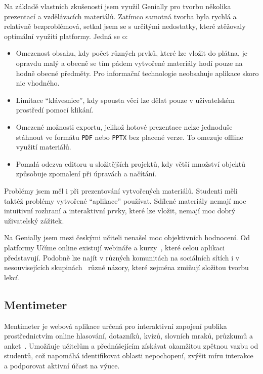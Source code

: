 Na základě vlastních zkušeností jsem využil Genially pro tvorbu několika prezentací a vzdělávacích materiálů. 
Zatímco samotná tvorba byla rychlá a relativně bezproblémová, setkal jsem se s určitými nedostatky, které ztěžovaly optimální využití platformy. 
Jedná se o:

\begin{itemize}
    \item Omezenost obsahu, kdy počet různých prvků, které lze vložit do plátna, je opravdu malý a obecně se tím pádem vytvořené materiály hodí pouze na hodně obecné předměty. Pro informační technologie neobsahuje aplikace skoro nic vhodného.  
    \item Limitace \enquote{klávesnice}, kdy spousta věcí lze dělat pouze v uživatelském prostředí pomocí klikání. 
    \item Omezené možnosti exportu, jelikož hotové prezentace nelze jednoduše stáhnout ve formátu \texttt{PDF} nebo \texttt{PPTX} bez placené verze. To omezuje offline využití materiálů.  
    \item Pomalá odezva editoru u složitějších projektů, kdy větší množství objektů způsobuje zpomalení při úpravách a načítání.  
\end{itemize}

Problémy jsem měl i při prezentování vytvořených materiálů. 
Studenti měli taktéž problémy vytvořené \enquote{aplikace} používat. 
Sdílené materiály nemají moc intuitivní rozhraní a interaktivní prvky, které lze vložit, nemají moc dobrý uživatelský zážitek.

Na Genially jsem mezi českými učiteli nenašel moc objektivních hodnocení.
Od platformy Učíme online existují webináře a kurzy~\cite{genially_ucimeonline}, které celou aplikaci představují.
Podobně lze najít v různých komunitách na sociálních sítích i v nesouvisejících skupinách~\cite{canva_facebook} různé názory, které zejména zmiňují složitou tvorbu lekcí.

\subsection{Mentimeter}

Mentimeter je webová aplikace určená pro interaktivní zapojení publika prostřednictvím online hlasování, dotazníků, kvízů, slovních mraků, průzkumů a anket~\cite{mentimeter}. 
Umožňuje učitelům a přednášejícím získávat okamžitou zpětnou vazbu od studentů, což napomáhá identifikovat oblasti nepochopení, zvýšit míru interakce a podporovat aktivní účast na výuce. 

